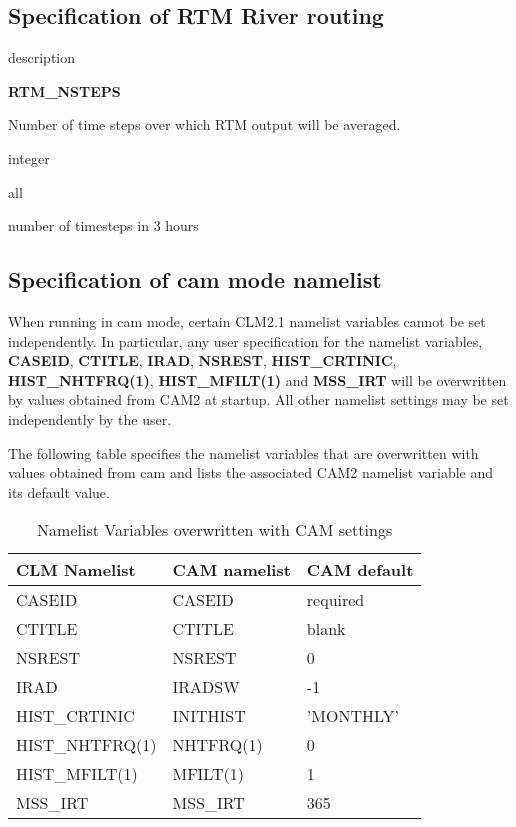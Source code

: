 \subsection {Specification of RTM River routing}

\begin{Ventry}{description}
 \item[{\bf name}] {\bf RTM\_NSTEPS}  
 \item[description] 
	Number of time steps over which RTM output will be averaged.
 \item[type] integer  
 \item[mode] all  
 \item[default] number of timesteps in 3 hours
\end{Ventry}
\bigskip

\subsection {Specification of cam mode namelist}
\label{subsec_cam_namelist}

When running in cam mode, certain CLM2.1 namelist variables cannot be
set independently.  In particular, any user specification for the
namelist variables, {\bf CASEID}, {\bf CTITLE}, {\bf IRAD}, {\bf
NSREST}, {\bf HIST\_CRTINIC}, {\bf HIST\_NHTFRQ(1)}, {\bf
HIST\_MFILT(1)} and {\bf MSS\_IRT} will be overwritten by values
obtained from CAM2 at startup. All other namelist settings may be set
independently by the user.

The following table specifies the namelist variables that are
overwritten with values obtained from cam and lists the associated CAM2
namelist variable and its default value.

\begin{longtable}{|l|l|l|}
\caption{\label{environment_vars} Namelist Variables overwritten with CAM settings} \\
\hline
CLM Namelist & CAM namelist & CAM default \\ \hline \hline
CASEID & CASEID & required \\ \hline
CTITLE & CTITLE & blank \\ \hline
NSREST & NSREST & 0 \\ \hline
IRAD & IRADSW  & -1 \\ \hline
HIST\_CRTINIC & INITHIST & 'MONTHLY' \\ \hline
HIST\_NHTFRQ(1) & NHTFRQ(1) & 0 \\ \hline
HIST\_MFILT(1) & MFILT(1) & 1 \\ \hline
MSS\_IRT & MSS\_IRT & 365 \\ \hline
\end{longtable}

